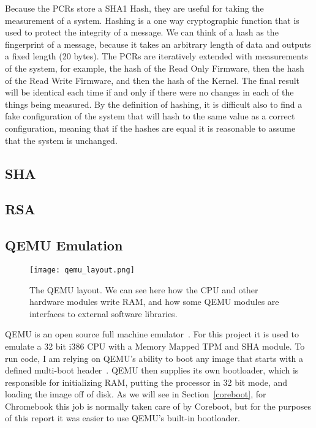 \documentclass[../report.tex]{subfiles}
\begin{document}
Because the PCRs store a SHA1 Hash, they are useful for taking the measurement of a system.  
Hashing is a one way cryptographic function that is used to protect the integrity of a message.
We can think of a hash as the fingerprint of a message, because it takes an arbitrary length of data and outputs a fixed length (20 bytes).
The PCRs are iteratively extended with measurements of the system, for example, the hash of the Read Only Firmware, then the hash of the Read Write Firmware, and then the hash of the Kernel.
The final result will be identical each time if and only if there were no changes in each of the things being measured.
By the definition of hashing, it is difficult also to find a fake configuration of the system that will hash to the same value as a correct configuration, meaning that if the hashes are equal it is reasonable to assume that the system is unchanged. 

\subsection{SHA}
\subsection{RSA}

\subsection{QEMU Emulation}\label{qemu_em}

\begin{figure}
  \centering
  \texttt{[image: qemu\_layout.png]}
  \caption{The QEMU layout. We can see here how the CPU and other hardware modules write RAM, and how some QEMU modules are interfaces to external software libraries.}
  \label{fig:qemu_layout}
\end{figure}

QEMU is an open source full machine emulator~\cite{qemu-site}.
For this project it is used to emulate a 32 bit i386 CPU with a Memory Mapped TPM and SHA module.
To run code, I am relying on QEMU's ability to boot any image that starts with a defined multi-boot header~\cite{multiboot}.
QEMU then supplies its own bootloader, which is responsible for initializing RAM, putting the processor in 32 bit mode, and loading the image off of disk.
As we will see in Section~\ref{coreboot}, for Chromebook this job is normally taken care of by Coreboot, but for the purposes of this report it was easier to use QEMU's built-in bootloader.
\end{document}
